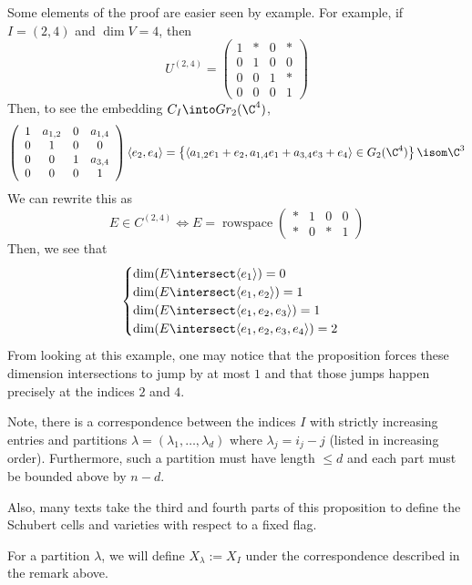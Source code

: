 \documentclass[11pt,leqno,oneside]{amsbook}
\numberwithin{thm}{section}
\newcommand{\Gr}{Gr}
\begin{document}
\begin{example}
Some elements of the proof are easier seen by example. For example, if
\(I=(2,4)\) and \(\dim V = 4\), then \[ 
  U^{(2,4)} = \left(
    \begin{array}{cccc}
      1&*&0&*\\
      0&1&0&0\\
      0&0&1&*\\
      0&0&0&1
    \end{array}
\right)
\]
Then, to see the embedding \(C_I \into \Gr_2(\C^4) \), \[
 \left(
    \begin{array}{cccc}
      1&a_{1,2}&0&a_{1,4}\\
      0&1&0&0\\
      0&0&1&a_{3,4}\\
      0&0&0&1
    \end{array}
  \right)\langle e_2, e_4 \rangle  = \left\{ \langle
    a_{1,2}e_1+e_2,a_{1,4}e_1+a_{3,4}e_3+e_4 \rangle \in G_2(\C^4)
  \right\} \isom \C^3
\]
We can rewrite this as \[
  E \in C^{(2,4)} \iff E = \operatorname{rowspace} \left(
    \begin{array}{cccc}
      *&1&0&0\\
      *&0&*&1
    \end{array}
\right)
\]
Then, we see that \[
  \begin{cases}
    \dim(E \intersect \langle e_1 \rangle) = 0\\
    \dim(E \intersect \langle e_1, e_2 \rangle) = 1\\
    \dim(E \intersect \langle e_1, e_2, e_3 \rangle) = 1\\
    \dim(E \intersect \langle e_1, e_2, e_3, e_4 \rangle) = 2\\
  \end{cases}
\]
From looking at this example, one may notice that the proposition
forces these dimension intersections to jump by at most \(1\) and
that those jumps happen precisely at the indices \(2\) and \(4\).
\end{example}
\begin{rmk}
  Note, there is a
  correspondence between the indices \(I\) with 
  strictly increasing entries and partitions \(\lambda = (\lambda_1,
  \ldots, 
  \lambda_d)\) where \(\lambda_j = i_j - j\) (listed in increasing
  order). Furthermore, such a partition must have length \(\leq d\) and
  each part must be bounded above by \(n-d\).

  Also, many texts take 
  the third and fourth parts of this proposition to define the
  Schubert cells and varieties with respect to a fixed flag. 
\end{rmk}
\begin{defn}
  For a partition \(\lambda\), we will define \(X_\lambda := X_I\)
  under the correspondence described in the remark above. 
\end{defn}
\end{document}
